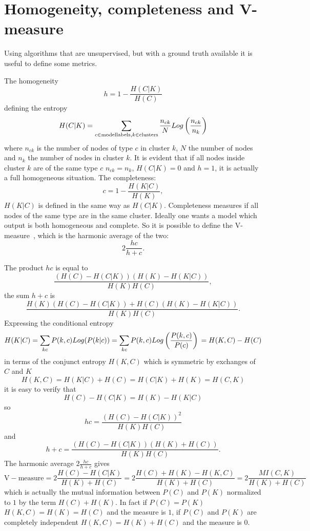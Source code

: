 \chapter{Homogeneity, completeness and V-measure}\label{app:vmeasure}
Using algorithms that are unsupervised, but with a ground truth available it is useful to define some metrics.

The homogeneity
\begin{equation}
    h=1-\frac{H(C|K)}{H(C)}
\end{equation}
defining the entropy
\begin{equation}
    H(C|K)=\sum_{c\in \mathrm{model labels},\\ k \in \mathrm{clusters}}\frac{n_{c k}}{N}Log\left(\frac{n_{c k}}{n_k}\right)
\end{equation}
where $n_{c k}$ is the number of nodes of type $c$ in cluster $k$, $N$ the number of nodes and $n_k$ the number of nodes in cluster $k$. It is evident that if all nodes inside cluster $k$ are of the same type $c$ $n_{c k}=n_{k}$, $H(C|K)=0$ and $h=1$, it is actually a full homogeneous situation.
The completeness:
\begin{equation}
    c=1-\frac{H(K|C)}{H(K)},
\end{equation}
$H(K|C)$ is defined in the same way as $H(C|K)$. Completeness measures if all nodes of the same type are in the same cluster.
Ideally one wants a model which output is both homogeneous and complete. So it is possible to define the V-measure~\cite{rosenberg2007v}, which is the harmonic average of the two:
\begin{equation}
    2\frac{h c}{h + c}.
\end{equation}

The product $h c$ is equal to
\begin{equation}
    \frac{(H(C)-H(C|K))(H(K)-H(K|C))}{H(K) H(C)},
\end{equation}
the sum $h + c$ is
\begin{equation}
    \frac{H(K)(H(C)-H(C|K))+H(C)(H(K)-H(K|C))}{H(K) H(C)}.
\end{equation}
Expressing the conditional entropy 
\[
H(K|C)=\sum_{k c} P(k,c)Log(P(k|c))
\\=\sum_{k c} P(k,c)Log\left(\frac{P(k,c)}{P(c)}\right)
\\=H(K,C) - H(C)
\]
in terms of the conjunct entropy $H(K,C)$ which is symmetric by exchanges of $C$ and $K$
\[
H(K,C)=H(K|C) + H(C) = H(C|K) + H(K) = H(C,K)
\]
it is easy to verify that 
\[
H(C) - H(C|K) = H(K) - H(K|C) 
\]
so
\[
h c = \frac{(H(C)-H(C|K))^2}{H(K) H(C)}
\]
and
\[
h + c = \frac{(H(C)-H(C|K))(H(K)+H(C))}{H(K) H(C)}.
\]
The harmonic average $2\frac{h c}{h + c}$ gives
\[
\mathrm{V-measure}=2\frac{H(C)-H(C|K)}{H(K)+H(C)}=2\frac{H(C)+H(K)-H(K,C)}{H(K)+H(C)}=2\frac{MI(C,K)}{H(K)+H(C)}
\]
which is actually the mutual information between $P(C)$ and $P(K)$ normalized to $1$ by the term $H(C)+H(K)$. In fact if $P(C)=P(K)$ $H(K,C)=H(K)=H(C)$ and the measure is $1$, if $P(C)$ and $P(K)$ are completely independent $H(K,C)=H(K)+H(C)$ and the measure is $0$.
